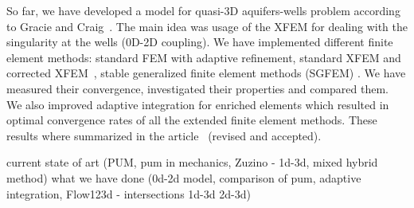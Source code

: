 \documentclass{sna}
\begin{document}
So far, we have developed a model for quasi-3D aquifers-wells problem according to Gracie and Craig~\cite{gracie_modelling_2010,craig_using_2011}.
The main idea was usage of the XFEM for dealing with the singularity at the wells (0D-2D coupling).
We have implemented different finite element methods: standard FEM with adaptive refinement, 
standard XFEM and corrected XFEM~\cite{fries_corrected_2008,fries_xfem_overview_2010},
stable generalized finite element methods (SGFEM) \cite{babuska_stable_2012, gupta_stable_2013}.
We have measured their convergence, investigated their properties and compared them. 
We also improved adaptive integration for enriched elements which resulted in optimal convergence rates of
all the extended finite element methods. These results where summarized in the article~\cite{exner_2015} (revised and accepted).




current state of art (PUM, pum in mechanics, Zuzino - 1d-3d, mixed hybrid method)
what we have done (0d-2d model, comparison of pum, adaptive integration, Flow123d - intersections 1d-3d 2d-3d)




    
\end{document}
